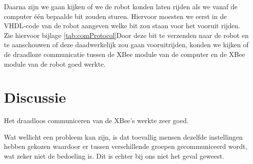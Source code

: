 \documentclass{report}
\begin{document}
Daarna zijn we gaan kijken of we de robot konden laten rijden als we vanaf de computer één bepaalde bit zouden sturen. Hiervoor moesten we eerst in de VHDL-code van de robot aangeven welke bit zou staan voor het vooruit rijden. Zie hiervoor bijlage \ref{tab:comProtocol}Door deze bit te verzenden naar de robot en te aanschouwen of deze daadwerkelijk zou gaan vooruitrijden, konden we kijken of de draadloze communicatie tussen de XBee module van de computer en de XBee module van de robot goed werkte.

\section{Discussie}

Het draadloos communiceren van de XBee's werkte zeer goed.

Wat wellicht een probleem kan zijn, is dat toevallig mensen dezelfde instellingen hebben gekozen waardoor er tussen verschillende groepen gecommuniceerd wordt, wat zeker niet de bedoeling is.
Dit is echter bij ons niet het geval geweest.
\end{document}

